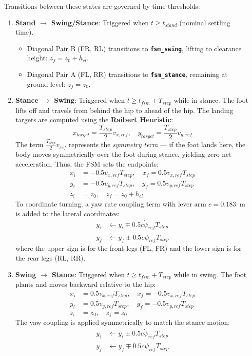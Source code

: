 \documentclass[11pt,a4paper]{article}
\begin{document}
Transitions between these states are governed by time thresholds:
\begin{enumerate}
    \item \textbf{Stand $\to$ Swing/Stance}: Triggered when $t \ge t_{stand}$ (nominal settling time).
    \begin{itemize}
        \item Diagonal Pair B (FR, RL) transitions to \textbf{\texttt{fsm\_swing}}, lifting to clearance height: $z_f = z_0 + h_{cl}$.
        \item Diagonal Pair A (FL, RR) transitions to \textbf{\texttt{fsm\_stance}}, remaining at ground level: $z_f = z_0$.
    \end{itemize}
    \item \textbf{Stance $\to$ Swing}: Triggered when $t \ge t_{fsm} + T_{step}$ while in stance. The foot lifts off and travels from behind the hip to ahead of the hip. The landing targets are computed using the \textbf{Raibert Heuristic}:
    \begin{equation}
    x_{target} = \frac{T_{step}}{2} v_{x,ref}, \quad y_{target} = \frac{T_{step}}{2} v_{y,ref}
    \end{equation}
    The term $\frac{T_{step}}{2} v_{ref}$ represents the \textit{symmetry term} — if the foot lands here, the body moves symmetrically over the foot during stance, yielding zero net acceleration. Thus, the FSM sets the endpoints:
    \begin{align}
    x_i &= -0.5 v_{x,ref} T_{step}, \quad x_f = 0.5 v_{x,ref} T_{step} \\
    y_i &= -0.5 v_{y,ref} T_{step}, \quad y_f = 0.5 v_{y,ref} T_{step} \\
    z_i &= z_0, \quad z_f = z_0 + h_{cl}
    \end{align}
    To coordinate turning, a yaw rate coupling term with lever arm $c = 0.183$~m is added to the lateral coordinates:
    \begin{align}
    y_i &\leftarrow y_i \mp 0.5 c \dot{\psi}_{ref} T_{step} \\
    y_f &\leftarrow y_f \pm 0.5 c \dot{\psi}_{ref} T_{step}
    \end{align}
    where the upper sign is for the front legs (FL, FR) and the lower sign is for the rear legs (RL, RR).
    
    \item \textbf{Swing $\to$ Stance}: Triggered when $t \ge t_{fsm} + T_{step}$ while in swing. The foot plants and moves backward relative to the hip:
    \begin{align}
    x_i &= 0.5 v_{x,ref} T_{step}, \quad x_f = -0.5 v_{x,ref} T_{step} \\
    y_i &= 0.5 v_{y,ref} T_{step}, \quad y_f = -0.5 v_{y,ref} T_{step} \\
    z_i &= z_0, \quad z_f = z_0
    \end{align}
    The yaw coupling is applied symmetrically to match the stance motion:
    \begin{align}
    y_i &\leftarrow y_i \pm 0.5 c \dot{\psi}_{ref} T_{step} \\
    y_f &\leftarrow y_f \mp 0.5 c \dot{\psi}_{ref} T_{step}
    \end{align}
\end{enumerate}
\end{document}
